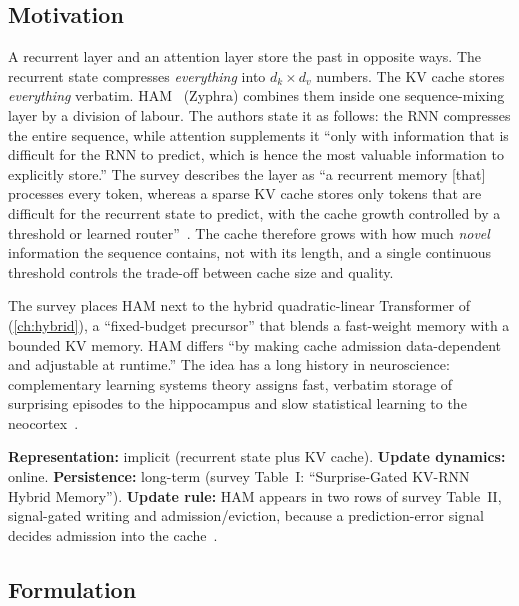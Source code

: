 \subsection{Motivation}

A recurrent layer and an attention layer store the past in opposite ways. The recurrent state
compresses \emph{everything} into $d_k\times d_v$ numbers. The KV cache stores \emph{everything}
verbatim. HAM~\citep{lufkin2026ham} (Zyphra) combines them inside one sequence-mixing layer by a
division of labour. The authors state it as follows: the RNN compresses the entire sequence, while
attention supplements it ``only with information that is difficult for the RNN to predict, which is
hence the most valuable information to explicitly store.'' The survey describes the layer as ``a
recurrent memory [that] processes every token, whereas a sparse KV cache stores only tokens that are
difficult for the recurrent state to predict, with the cache growth controlled by a threshold or
learned router''~\citep{zhoubian2026memory}. The cache therefore grows with how much \emph{novel}
information the sequence contains, not with its length, and a single continuous threshold controls the
trade-off between cache size and quality.

The survey places HAM next to the hybrid quadratic-linear Transformer of
\citet{irie2025blending} (\cref{ch:hybrid}), a ``fixed-budget precursor'' that blends a fast-weight
memory with a bounded KV memory. HAM differs ``by making cache admission data-dependent and
adjustable at runtime.'' The idea has a long history in neuroscience: complementary learning systems
theory assigns fast, verbatim storage of surprising episodes to the hippocampus and slow statistical
learning to the neocortex~\citep{c13-mcclelland1995cls}.

\begin{taxonomy}
\textbf{Representation:} implicit (recurrent state plus KV cache). \textbf{Update dynamics:}
online. \textbf{Persistence:} long-term (survey Table~I: ``Surprise-Gated KV-RNN Hybrid Memory'').
\textbf{Update rule:} HAM appears in two rows of survey Table~II, signal-gated writing and
admission/eviction, because a prediction-error signal decides admission into the cache~\citep{zhoubian2026memory}.
\end{taxonomy}

\subsection{Formulation}\label{sec:c13-ham-form}

